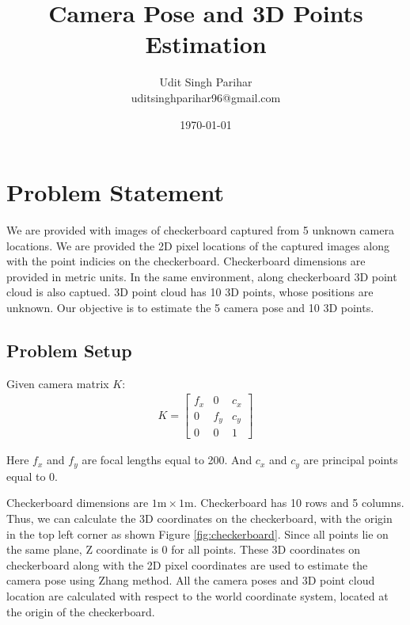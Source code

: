 \documentclass{article}
\title{Camera Pose and 3D Points Estimation}
\author{Udit Singh Parihar \\ uditsinghparihar96@gmail.com}
\date{\today}
\begin{document}
\maketitle


\section{Problem Statement}
We are provided with images of checkerboard captured from 5 unknown camera locations. We are provided the 2D pixel locations of the captured images along with the point indicies
on the checkerboard. Checkerboard dimensions are provided in metric units. In the same environment, along checkerboard 3D point cloud is also captued. 3D point cloud has 10 3D 
points, whose positions are unknown. Our objective is to estimate the 5 camera pose and 10 3D points.

\subsection{Problem Setup}
Given camera matrix $K$:
\begin{align}
    K = \begin{bmatrix} f_x & 0 & c_x \\ 0 & f_y & c_y \\ 0 & 0 & 1 \end{bmatrix}
\end{align}

Here $f_x$ and $f_y$ are focal lengths equal to 200. And $c_x$ and $c_y$ are principal points equal to 0. 

Checkerboard dimensions are $1 \text{m} \times 1 \text{m}$. Checkerboard has 10 rows and 5 columns. Thus, we can calculate the 3D coordinates on the checkerboard, with the origin
in the top left corner as shown Figure \ref{fig:checkerboard}. Since all points lie on the same plane, Z coordinate is 0 for all points. These 3D coordinates on checkerboard along with the 2D pixel coordinates are used
to estimate the camera pose using Zhang method. All the camera poses and 3D point cloud location are calculated with respect to the world coordinate system, located at the origin of the checkerboard.
\end{document}
